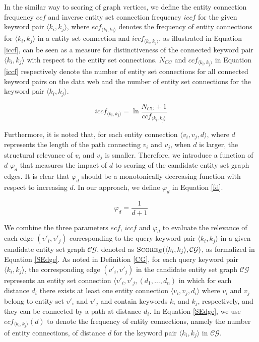 In the similar way to scoring of graph vertices, we define the entity connection frequency $ecf$ and
inverse entity set connection frequency $iccf$ for the given keyword pair $\langle k_i,k_j \rangle$,
where $ecf_{\langle k_i,k_j \rangle}$ denotes the frequency of entity connections for $\langle
k_i,k_j \rangle$ in a entity set connection and $iccf_{\langle k_i,k_j \rangle}$, as illustrated in
Equation \ref{iccf}, can be seen as a measure for distinctiveness of the connected keyword pair
$\langle k_i,k_j \rangle$ with respect to the entity set connections. $N_{CC}$ and $ccf_{\langle
k_i,k_j \rangle}$ in Equation \ref{iccf} respectively denote the number of entity set connections for
all connected keyword pairs on the data web and the number of entity set connections for the keyword
pair $\langle k_i,k_j \rangle$.

\begin{equation}\label{iccf}
iccf_{\langle k_i,k_j \rangle} = \ln\frac{N_{CC}+1}{ccf_{\langle k_i,k_j \rangle}}
\end{equation}

Furthermore, it is noted that, for each entity connection $\langle v_i,v_j,d \rangle$, where $d$
represents the length of the path connecting $v_i$ and $v_j$, when $d$ is larger, the structural
relevance of $v_i$ and $v_j$ is smaller. Therefore, we introduce a function of $d$  $\varphi_d$ that
measures the impact of $d$ to scoring of the candidate entity set graph edges. It is clear that
$\varphi_d$ should be a monotonically decreasing function with respect to increasing $d$. In our
approach, we define $\varphi_d$ in Equation \ref{fd}.

\begin{equation}\label{fd} 
\varphi_d = \frac{1}{d+1}
\end{equation}

We combine the three parameters $ecf$, $iccf$ and $\varphi_d$ to evaluate the relevance of each edge
$(v'_i,v'_j)$ corresponding to the query keyword pair $\langle k_i,k_j \rangle$ in a given candidate
entity set graph $\mathcal{CG}$, denoted as $\textsc{Score}_{E}(\langle k_i,k_j
\rangle,\mathcal{CG})$, as formalized in Equation \ref{SEdge}. As noted in Definition \ref{CG}, for
each query keyword pair $\langle k_i,k_j \rangle$, the corresponding edge $(v'_i,v'_j)$ in the
candidate entity set graph $\mathcal{CG}$ represents an entity set connection $\langle
v'_i,v'_j,(d_1,\ldots,d_n)$ in which for each distance $d_i$ there exists at least one entity
connection $\langle v_i,v_j,d_i \rangle$ where $v_i$ and $v_j$ belong to entity set $v'_i$ and $v'_j$
and contain keywords $k_i$ and $k_j$, respectively, and they can be connected by a path at distance
$d_i$. In Equation \ref{SEdge}, we use $ecf_{\langle k_i,k_j \rangle}(d)$ to denote the frequency of
entity connections, namely the number of entity connections, of distance $d$ for the keyword pair
$\langle k_i,k_j \rangle$ in $\mathcal{CG}$.


